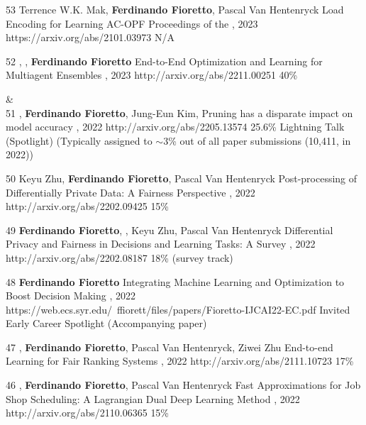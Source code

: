 \begin{pubs}
\confentry
	{53} %
	{Terrence W.K. Mak, {\bf Ferdinando Fioretto}, Pascal Van Hentenryck}
	{Load Encoding for Learning AC-OPF}
	{Proceedings of the , 2023}
	{https://arxiv.org/abs/2101.03973}
	{N/A}

\confentry
    {52} %
	{, , {\bf Ferdinando Fioretto}}
	{End-to-End Optimization and Learning for Multiagent Ensembles}
    {\procAAMAS, 2023}
	{http://arxiv.org/abs/2211.00251}
    {40\%}

{}&\nemph{\rule{0.5\linewidth}{0.5pt}}\\[1em]

\confentryAwd
	{51} %
	{, {\bf Ferdinando Fioretto}, Jung-Eun Kim, }
	{Pruning has a disparate impact on model accuracy}
	{\procNeurIPS, 2022}
	{http://arxiv.org/abs/2205.13574}
	{25.6\%}
	{Lightning Talk (Spotlight)}
	{(Typically assigned to $\sim$3\% out of all paper submissions (10,411, in 2022))}

	\confentry
	{50} %
	{Keyu Zhu, {\bf Ferdinando Fioretto}, Pascal Van Hentenryck}
	{Post-processing of Differentially Private Data: A Fairness Perspective}
	{\procIJCAI, 2022}
	{http://arxiv.org/abs/2202.09425}	
	{15\%}

	\confentry
	{49} %
	{{\bf Ferdinando Fioretto}, , Keyu Zhu, Pascal Van Hentenryck}
	{Differential Privacy and Fairness in Decisions and Learning Tasks: A Survey}
	{\procIJCAI, 2022}
	{http://arxiv.org/abs/2202.08187}	
	{18\% (survey track)}

	\confentryAwd
	{48} %
	{{\bf Ferdinando Fioretto}}
	{Integrating Machine Learning and Optimization to Boost Decision Making}
	{\procIJCAI, 2022}
	{https://web.ecs.syr.edu/~ffiorett/files/papers/Fioretto-IJCAI22-EC.pdf}	
	{Invited}
	{Early Career Spotlight}
	{(Accompanying paper)}

	\confentry
	{47} %
	{, {\bf Ferdinando Fioretto}, Pascal Van Hentenryck, Ziwei Zhu}
	{End-to-end Learning for Fair Ranking Systems}
	{\procWWW, 2022}
	{http://arxiv.org/abs/2111.10723}	
	{17\%}
	
	\confentry
	{46} %
	{, {\bf Ferdinando Fioretto}, Pascal Van Hentenryck}
	{Fast Approximations for Job Shop Scheduling: A Lagrangian Dual Deep Learning Method}
	{\procAAAI, 2022}
	{http://arxiv.org/abs/2110.06365}
	{15\%}


\end{pubs}
